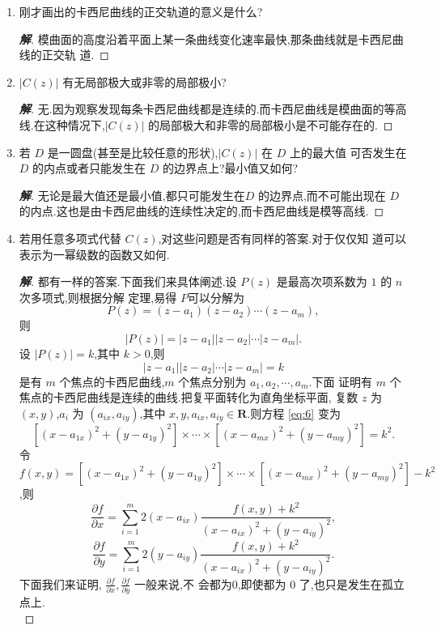 \documentclass[a4paper]{article}
\newcommand{\pa}{\partial} \newcommand{\Om}{\Omega}
\begin{document}
\begin{enumerate}
\begin{proof}[\bf{解}]
\texttt{[image: /home/luqing/math/visual-complex-analysis/exercise2-9-7-3.png]}
\end{proof}
\item 刚才画出的卡西尼曲线的正交轨道的意义是什么?
  \begin{proof}[\bf{解}]
模曲面的高度沿着平面上某一条曲线变化速率最快,那条曲线就是卡西尼曲线的正交轨
道.
  \end{proof}
\item $|C(z)|$ 有无局部极大或非零的局部极小?
  \begin{proof}[\bf{解}]
    无.因为观察发现每条卡西尼曲线都是连续的.而卡西尼曲线是模曲面的等高
    线.在这种情况下,$|C(z)|$ 的局部极大和非零的局部极小是不可能存在的.
  \end{proof}
\item 若 $D$ 是一圆盘(甚至是比较任意的形状),$|C(z)|$ 在 $D$ 上的最大值
  可否发生在 $D$ 的内点或者只能发生在 $D$ 的边界点上?最小值又如何?
  \begin{proof}[\bf{解}]
    无论是最大值还是最小值,都只可能发生在$D$ 的边界点,而不可能出现在
    $D$ 的内点.这也是由卡西尼曲线的连续性决定的,而卡西尼曲线是模等高线.
  \end{proof}
\item 若用任意多项式代替 $C(z)$,对这些问题是否有同样的答案.对于仅仅知
  道可以表示为一幂级数的函数又如何.
  \begin{proof}[\bf{解}]
都有一样的答案.下面我们来具体阐述.设 $P(z)$ 是最高次项系数为 $1$ 的 $n$ 次多项式,则根据分解
定理,易得 $P$可以分解为
$$
P(z)=(z-a_1)(z-a_2)\cdots (z-a_m),
$$
则 
$$
|P(z)|=|z-a_1||z-a_2|\cdots |z-a_m|.
$$
设 $|P(z)|=k$,其中 $k>0$,则
\begin{equation}\label{eq:6}
|z-a_1||z-a_2|\cdots |z-a_m|=k
\end{equation}
是有 $m$ 个焦点的卡西尼曲线,$m$ 个焦点分别为 $a_1,a_2,\cdots,a_m$.下面
证明有 $m$ 个焦点的卡西尼曲线是连续的曲线.把复平面转化为直角坐标平面,
复数 $z$ 为 $(x,y)$,$a_i$ 为 $(a_{ix},a_{iy})$,其中
$x,y,a_{ix},a_{iy}\in \mathbf{R}$.则方程 \eqref{eq:6} 变为
\begin{equation}
  \label{eq:7}
  [(x-a_{1x})^2+(y-a_{1y})^2]\times \cdots\times [(x-a_{mx})^2+(y-a_{my})^2]=k^2.
\end{equation}
令 $f(x,y)=  [(x-a_{1x})^2+(y-a_{1y})^2]\times \cdots\times
[(x-a_{mx})^2+(y-a_{my})^2]-k^2$,则
$$
\frac{\pa f}{\pa x}=\sum_{i=1}^{m} 2(x-a_{ix})\frac{f(x,y)+k^2}{(x-a_{ix})^2+(y-a_{iy})^2},
$$
$$
\frac{\pa f}{\pa y}=\sum_{i=1}^m 2(y-a_{iy})\frac{f(x,y)+k^2}{(x-a_{ix})^2+(y-a_{iy})^2}.
$$
下面我们来证明, $\frac{\pa f}{\pa x},\frac{\pa f}{\pa y}$ 一般来说,不
会都为$0$,即使都为 $0$ 了,也只是发生在孤立点上.\\


\end{proof}
\end{enumerate}
\end{document}
